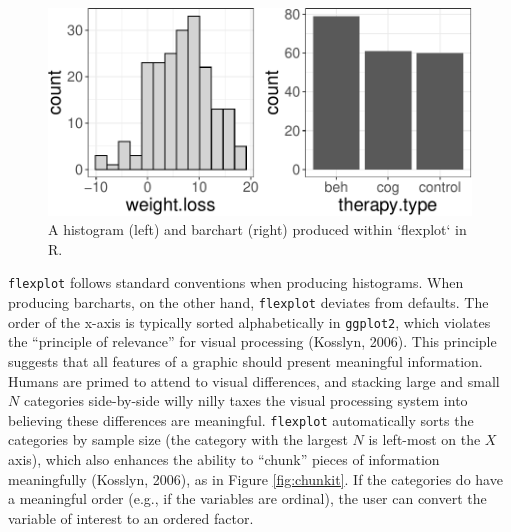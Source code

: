\documentclass[
  doc]{apa6}
\begin{document}
\begin{figure}

{\centering \includegraphics[width=0.9\linewidth]{flexplot_psychmeth_files/figure-latex/unnamed-chunk-3-1} 

}

\caption{A histogram (left) and barchart (right) produced within `flexplot` in R. }\label{fig:unnamed-chunk-3}
\end{figure}

\texttt{flexplot} follows standard conventions when producing histograms. When producing barcharts, on the other hand, \texttt{flexplot} deviates from defaults. The order of the x-axis is typically sorted alphabetically in \texttt{ggplot2}, which violates the \enquote{principle of relevance} for visual processing (Kosslyn, 2006). This principle suggests that all features of a graphic should present meaningful information. Humans are primed to attend to visual differences, and stacking large and small \(N\) categories side-by-side willy nilly taxes the visual processing system into believing these differences are meaningful. \texttt{flexplot} automatically sorts the categories by sample size (the category with the largest \(N\) is left-most on the \(X\) axis), which also enhances the ability to \enquote{chunk} pieces of information meaningfully (Kosslyn, 2006), as in Figure \ref{fig:chunkit}. If the categories do have a meaningful order (e.g., if the variables are ordinal), the user can convert the variable of interest to an ordered factor.
\end{document}
